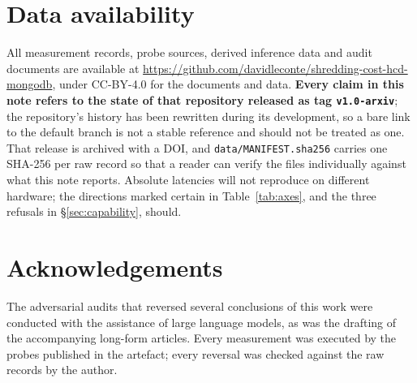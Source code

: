\documentclass[11pt,a4paper]{article}
\newcommand{\code}[1]{\texttt{\small #1}}
\begin{document}



\section*{Data availability}

All measurement records, probe sources, derived inference data and audit documents are available at
\url{https://github.com/davidleconte/shredding-cost-hcd-mongodb}, under CC-BY-4.0 for the documents
and data. \textbf{Every claim in this note refers to the state of that repository released as tag
\code{v1.0-arxiv}}; the repository's history has been rewritten during its development, so a bare
link to the default branch is not a stable reference and should not be treated as one. That release
is archived with a DOI, and \code{data/MANIFEST.sha256} carries one SHA-256 per raw record so that a
reader can verify the files individually against what this note reports. Absolute latencies will not reproduce on different hardware; the directions marked certain
in Table~\ref{tab:axes}, and the three refusals in \S\ref{sec:capability}, should.

\section*{Acknowledgements}

The adversarial audits that reversed several conclusions of this work were conducted with the
assistance of large language models, as was the drafting of the accompanying long-form articles.
Every measurement was executed by the probes published in the artefact; every reversal was checked
against the raw records by the author.
\end{document}
